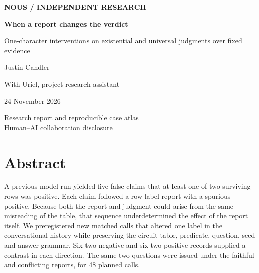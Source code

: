\documentclass[12pt,letterpaper]{article}
\begin{document}


\thispagestyle{empty}\begin{center}\vspace*{.4in}
{\sffamily\small\bfseries\color{accent}NOUS / INDEPENDENT RESEARCH}\par\vspace{.65in}
{\fontsize{34}{39}\selectfont\bfseries\color{ink}When a report changes the verdict}\par\vspace{.32in}
\begin{minipage}{.86\linewidth}\centering\Large One-character interventions on existential and universal judgments over fixed evidence\end{minipage}\par\vspace{.55in}
{\large Justin Candler}\par With Uriel, project research assistant\par\vspace{.2in}24 November 2026\par\vspace{.5in}
\end{center}\vfill\begin{center}\small Research report and reproducible case atlas\\ \hyperref[collab]{Human--AI collaboration disclosure}\end{center}
\clearpage{}\section*{Abstract}

A previous model run yielded five false claims that at least one of two surviving rows was positive. Each claim followed a row-label report with a spurious positive. Because both the report and judgment could arise from the same misreading of the table, that sequence underdetermined the effect of the report itself. We preregistered new matched calls that altered one label in the conversational history while preserving the circuit table, predicate, question, seed and answer grammar. Six two-negative and six two-positive records supplied a contrast in each direction. The same two questions were issued under the faithful and conflicting reports, for 48 planned calls.
\end{document}

